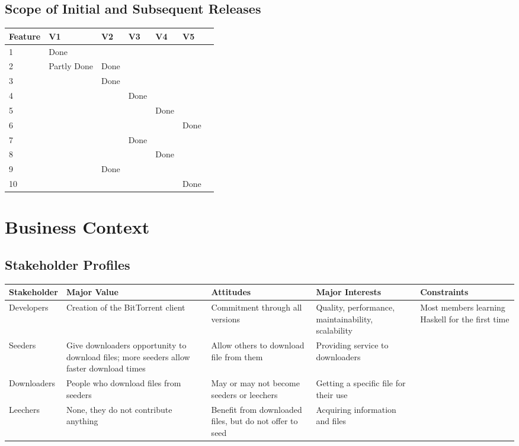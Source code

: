 \documentclass[letter]{scrartcl}
\begin{document}
\subsection{Scope of Initial and Subsequent Releases}
\begin{tabularx}{\textwidth}{| X | X | X | X | X | X | X |}
\hline
\textbf{Feature} & \textbf{V1} & \textbf{V2} & \textbf{V3} & \textbf{V4} & \textbf{V5} \\
\hline
\hline
1 & Done & & & & \\
\hline
2 & Partly Done & Done & & & \\
\hline
3 & & Done & & & \\
\hline
4 & & & Done & & \\
\hline
5 & & & & Done & \\
\hline
6 & & & & & Done \\
\hline
7 & & & Done & & \\
\hline
8 & & & & Done & \\
\hline
9 & & Done & & & \\
\hline
10 & & & & & Done \\
\hline
\end{tabularx}



\section{Business Context}
\subsection{Stakeholder Profiles}
\tabcolsep=0.11cm
\begin{tabularx}{\textwidth}{| X | X | X | X | X |}
\hline
\textbf{Stakeholder} & \textbf{Major Value} & \textbf{Attitudes} & \textbf{Major Interests} & \textbf{Constraints} \\
\hline
\hline
Developers & Creation of the BitTorrent client & Commitment through all versions & Quality, performance, maintainability, scalability & Most members learning Haskell for the first time \\
\hline
Seeders & Give downloaders opportunity to download files; more seeders allow faster download times & Allow others to download file from them & Providing service to downloaders &  \\ 
\hline
Downloaders & People who download files from seeders & May or may not become seeders or leechers & Getting a specific file for their use & \\
\hline
Leechers& None, they do not contribute anything & Benefit from downloaded files, but do not offer to seed & Acquiring information and files & \\
\hline
\end{tabularx}
\end{document}
